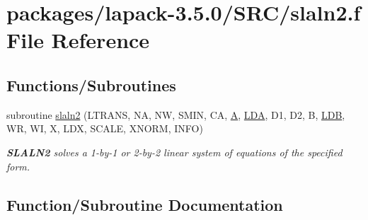 \hypertarget{slaln2_8f}{}\section{packages/lapack-\/3.5.0/\+S\+R\+C/slaln2.f File Reference}
\label{slaln2_8f}
\subsection*{Functions/\+Subroutines}
\begin{DoxyCompactItemize}
\item 
subroutine \hyperlink{slaln2_8f_a27aadaab094e78b734d2e655217963a5}{slaln2} (L\+T\+R\+A\+N\+S, N\+A, N\+W, S\+M\+I\+N, C\+A, \hyperlink{classA}{A}, \hyperlink{example__user_8c_ae946da542ce0db94dced19b2ecefd1aa}{L\+D\+A}, D1, D2, B, \hyperlink{example__user_8c_a50e90a7104df172b5a89a06c47fcca04}{L\+D\+B}, W\+R, W\+I, X, L\+D\+X, S\+C\+A\+L\+E, X\+N\+O\+R\+M, I\+N\+F\+O)
\begin{DoxyCompactList}\small\item\em {\bfseries S\+L\+A\+L\+N2} solves a 1-\/by-\/1 or 2-\/by-\/2 linear system of equations of the specified form. \end{DoxyCompactList}\end{DoxyCompactItemize}


\subsection{Function/\+Subroutine Documentation}
\hypertarget{slaln2_8f_a27aadaab094e78b734d2e655217963a5}{}
